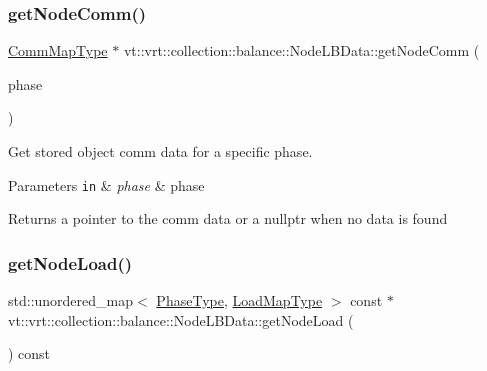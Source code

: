 \subsubsection{\texorpdfstring{get\+Node\+Comm()}{getNodeComm()}\hspace{0.1cm}{\footnotesize\ttfamily [2/2]}}
{\footnotesize\ttfamily \hyperlink{namespacevt_1_1vrt_1_1collection_1_1balance_a01ee1fb0ae2da1d2ab7fdca3be9ae351}{Comm\+Map\+Type} $\ast$ vt\+::vrt\+::collection\+::balance\+::\+Node\+L\+B\+Data\+::get\+Node\+Comm (\begin{DoxyParamCaption}\item[{\hyperlink{namespacevt_a46ce6733d5cdbd735d561b7b4029f6d7}{Phase\+Type}}]{phase }\end{DoxyParamCaption})}



Get stored object comm data for a specific phase. 


\begin{DoxyParams}[1]{Parameters}
\mbox{\tt in}  & {\em phase} & phase\\
\hline
\end{DoxyParams}
\begin{DoxyReturn}{Returns}
a pointer to the comm data or a nullptr when no data is found 
\end{DoxyReturn}
\mbox{\label{structvt_1_1vrt_1_1collection_1_1balance_1_1_node_l_b_data_a6a1d3d7f8ae930f1d5f97fafc91e118c}} 
\subsubsection{\texorpdfstring{get\+Node\+Load()}{getNodeLoad()}}
{\footnotesize\ttfamily std\+::unordered\+\_\+map$<$ \hyperlink{namespacevt_a46ce6733d5cdbd735d561b7b4029f6d7}{Phase\+Type}, \hyperlink{namespacevt_1_1vrt_1_1collection_1_1balance_a5339303db2e1ce964d783a53fd74e6b1}{Load\+Map\+Type} $>$ const  $\ast$ vt\+::vrt\+::collection\+::balance\+::\+Node\+L\+B\+Data\+::get\+Node\+Load (\begin{DoxyParamCaption}{ }\end{DoxyParamCaption}) const}




